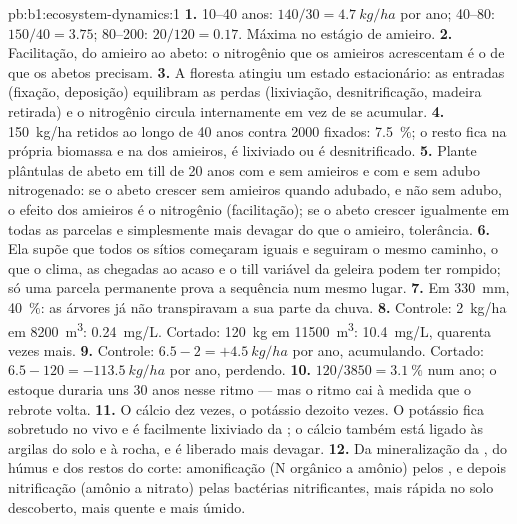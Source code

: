 \begin{solution}{pb:b1:ecosystem-dynamics:1}
\textbf{1.} 10--40 anos: $140/30 = \qty{4.7}{kg/ha}$ por ano; 40--80:
$150/40 = \num{3.75}$; 80--200: $20/120 = \num{0.17}$. Máxima no
estágio de amieiro.
\textbf{2.} Facilitação, do amieiro ao abeto: o nitrogênio que os
amieiros acrescentam é o de que os abetos precisam.
\textbf{3.} A floresta atingiu um estado estacionário: as entradas
(fixação, deposição) equilibram as perdas (lixiviação,
desnitrificação, madeira retirada) e o nitrogênio circula internamente
em vez de se acumular.
\textbf{4.} \qty{150}{kg/ha} retidos ao longo de 40 anos contra
\num{2000} fixados: \qty{7.5}{\%}; o resto fica na própria biomassa e
na  dos amieiros, é lixiviado ou é desnitrificado.
\textbf{5.} Plante plântulas de abeto em till de 20 anos com e sem
amieiros e com e sem adubo nitrogenado: se o abeto crescer sem
amieiros quando adubado, e não sem adubo, o efeito dos amieiros é o
nitrogênio (facilitação); se o abeto crescer igualmente em todas as
parcelas e simplesmente mais devagar do que o amieiro, tolerância.
\textbf{6.} Ela supõe que todos os sítios começaram iguais e seguiram
o mesmo caminho, o que o clima, as chegadas ao acaso e o till variável
da geleira podem ter rompido; só uma parcela permanente prova a
sequência num mesmo lugar.
\textbf{7.} Em \qty{330}{mm}, \qty{40}{\%}: as árvores já não
transpiravam a sua parte da chuva.
\textbf{8.} Controle: \qty{2}{kg/ha} em \qty{8200}{m^3}:
\qty{0.24}{mg/L}. Cortado: \qty{120}{kg} em \qty{11500}{m^3}:
\qty{10.4}{mg/L}, quarenta vezes mais.
\textbf{9.} Controle: $6.5 - 2 = +\qty{4.5}{kg/ha}$ por ano,
acumulando. Cortado: $6.5 - 120 = -\qty{113.5}{kg/ha}$ por ano,
perdendo.
\textbf{10.} $120/3850 = \qty{3.1}{\%}$ num ano; o estoque duraria uns
\num{30} anos nesse ritmo --- mas o ritmo cai à medida que o rebrote
volta.
\textbf{11.} O cálcio dez vezes, o potássio dezoito vezes. O potássio
fica sobretudo no  vivo e é facilmente lixiviado da
; o cálcio também está ligado às argilas do solo e à
rocha, e é liberado mais devagar.
\textbf{12.} Da mineralização da , do húmus e dos restos
do corte: amonificação (N orgânico a amônio) pelos , e
depois nitrificação (amônio a nitrato) pelas bactérias nitrificantes,
mais rápida no solo descoberto, mais quente e mais úmido.

\end{solution}
